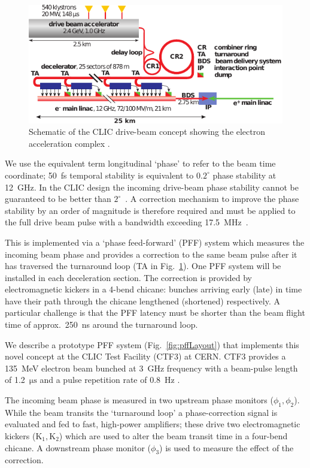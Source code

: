 \documentclass[%
 reprint,
 superscriptaddress,
 amsmath,
 amssymb,
 prl,
]{revtex4-1}
\begin{document}
\begin{figure}
	\includegraphics[width=\columnwidth]{figs/alt/clicLayout_cut_e-}
	\caption{\label{fig:CLICLayout} Schematic of the CLIC drive-beam 
	concept showing the electron acceleration complex \cite{CLIC-staging}.
	}
\end{figure}


We use the equivalent term longitudinal ‘phase’ to refer to the beam time 
coordinate; 50~fs temporal stability is equivalent to \(0.2^\circ\) phase 
stability at 12~GHz. In the CLIC design the incoming drive-beam phase stability 
cannot be guaranteed to be better than \(2^\circ\)~\cite{CLICCDR}. A correction 
mechanism to improve the phase stability by an order of magnitude is 
therefore required and must be applied to the full drive beam pulse with a 
bandwidth exceeding 17.5~MHz~\cite{Gerber2015}. 

This is implemented via a `phase feed-forward' (PFF) system which measures the 
incoming beam phase and provides a correction to the same beam pulse 
after it has traversed the turnaround loop (TA in Fig.~\ref{fig:CLICLayout}). 
One PFF system will be installed in each deceleration section. The correction 
is provided by electromagnetic kickers in a 4-bend chicane: bunches arriving 
early (late) in time have their path through the chicane lengthened (shortened) 
respectively. A particular challenge is that the PFF latency must be shorter 
than the beam flight time of approx.~250~ns around the turnaround loop.

We describe a prototype PFF system (Fig.~\ref{fig:pffLayout}) that implements 
this novel concept at the CLIC Test Facility (CTF3) at CERN. CTF3 provides a 
135~MeV electron beam bunched at 3~GHz frequency with a beam-pulse length of 
1.2~\(\mathrm{\mu s}\) and a pulse repetition rate of 0.8~Hz \cite{CLICCDR}. 

The incoming beam phase is measured in two upstream phase 
monitors (\(\phi_{1}, \phi_{2}\)). While the beam 
transits the ‘turnaround loop’ a phase-correction signal is evaluated and fed 
to fast, high-power amplifiers; these drive two electromagnetic kickers 
(\(\mathrm{K_1, K_2}\)) which are used to alter the beam transit time in a 
four-bend chicane. A downstream phase monitor (\(\phi_{3}\)) is 
used to measure the effect of the correction. 
\end{document}
